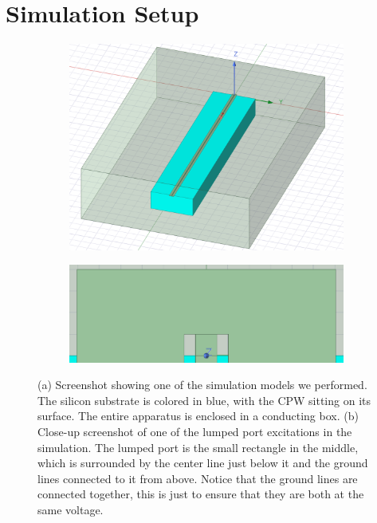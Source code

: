 \section{Simulation Setup}
\label{setup}

\begin{figure}
	\centering
	\begin{subfigure}{0.4\textwidth}
		\includegraphics[scale=0.15]{images/short-finiteconductivity.png}
		\caption{}
		\label{short-model}
	\end{subfigure}
	\hspace{0.5cm}
	\begin{subfigure}{0.4\textwidth}
		\includegraphics[scale=0.3]{images/port-geometry.png}
		\caption{}
		\label{port-geometry}
	\end{subfigure}
	\caption{(a) Screenshot showing one of the simulation models we performed. The silicon substrate is
		colored in blue, with the CPW sitting on its surface. The entire apparatus is enclosed in a
	conducting box. (b) Close-up screenshot of one of the lumped port excitations in the simulation. The
	lumped port is the small rectangle in the middle, which is surrounded by the center line just below it
	and the ground lines connected to it from above. Notice that the ground lines are connected together,
	this is just to ensure that they are both at the same voltage. } 
\end{figure}

